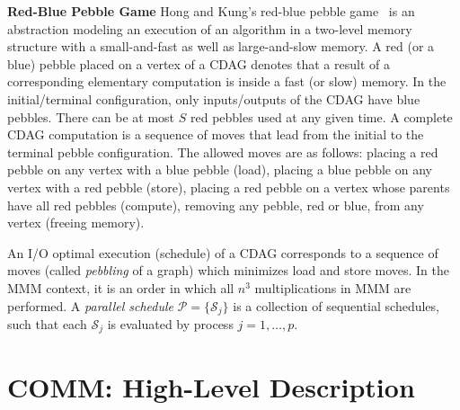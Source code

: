 \documentclass[sigplan,review,anonymous,10pt]{acmart}\settopmatter{printfolios=true,printccs=false,printacmref=false}
\newcommand\greg[1]{\textcolor{blue}{[Greg: #1]}}
\newcommand\mac[1]{\textcolor{red}{[Mac: #1]}}
\newcommand{\macb}[1]{\textbf{\textsf{#1}}}
\begin{document}
\macb{Red-Blue Pebble Game} Hong and Kung's red-blue pebble game~\cite{redblue} 
is an abstraction modeling
an execution of an algorithm in a two-level memory structure with a
small-and-fast as well as large-and-slow memory. A red (or a blue) pebble
placed on a vertex of a CDAG denotes that a result of a corresponding 
elementary computation is inside
a fast (or slow) memory. 
In the initial/terminal configuration, only inputs/outputs of the CDAG have
blue pebbles.
%
There can be at most $S$ red pebbles used at any given time. A complete 
CDAG computation is a
sequence of moves that lead from the initial to the terminal pebble
configuration.
%
The allowed moves are as follows:  placing a red pebble on any
vertex with a blue pebble (load),  placing a blue pebble on any
vertex with a red pebble (store),  placing a red pebble on a vertex
whose parents have all red pebbles (compute), removing any pebble, 
red or blue, from any vertex (freeing memory).

An I/O optimal execution (schedule) of a CDAG corresponds to a sequence of 
moves (called 
\emph{pebbling} of a graph) which minimizes load and store moves.
%
In the MMM context, it is an order in which all $n^3$
multiplications in MMM are performed. A \emph{parallel schedule} $\mathcal{P} = 
\{\mathcal{S}_j\}$ is a collection of sequential schedules, such that each 
$\mathcal{S}_j$ is evaluated by process $j = 1, \dots, p$.

\section{COMM: High-Level Description}
\label{sec:commDescr}
%
\end{document}
